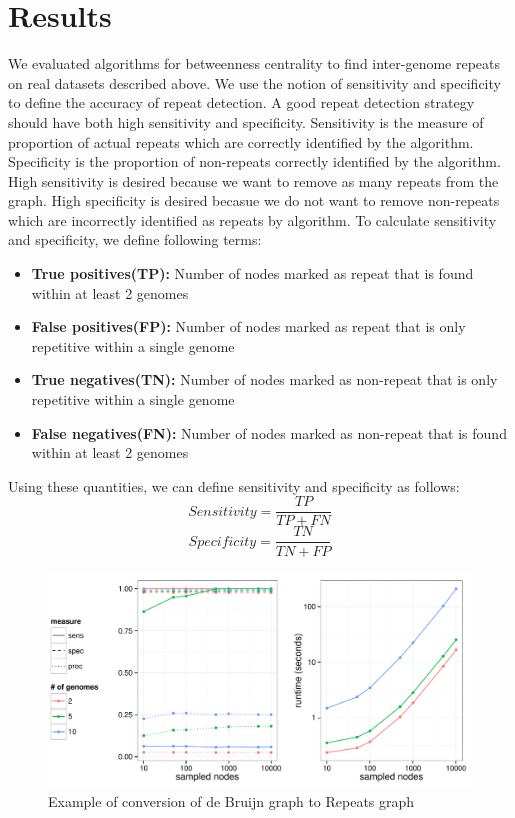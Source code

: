 \documentclass[runningheads,a4paper]{llncs}
\begin{document}
\section{Results} 
We evaluated algorithms for betweenness centrality to find inter-genome repeats on real datasets described above. We use the notion of sensitivity and specificity to define the accuracy of repeat detection. A good repeat detection strategy should have both high sensitivity and specificity. Sensitivity is the measure of proportion of actual repeats which are correctly identified by the algorithm. Specificity is the proportion of non-repeats correctly identified by the algorithm. High sensitivity is desired because we want to remove as many repeats from the graph. High specificity is desired becasue we do not want to remove non-repeats which are incorrectly identified as repeats by algorithm. To calculate sensitivity and specificity, we define following terms:
\begin{itemize}
\item \textbf{True positives(TP):} Number of nodes marked as repeat that is found within at least 2 genomes
\item \textbf{False positives(FP):} Number of nodes marked as repeat that is only repetitive within a single genome
\item \textbf{True negatives(TN):} Number of nodes marked as non-repeat that is only repetitive within a single genome
\item \textbf{False negatives(FN):} Number of nodes marked as non-repeat that is found within at least 2 genomes
\end{itemize}

Using these quantities, we can define sensitivity and specificity as follows:
 $$Sensitivity = \frac{TP}{TP+FN}$$
 $$Specificity = \frac{TN}{TN+FP}$$


\begin{figure}[htbp]
\centering
\includegraphics[width = \textwidth]{sampled_nodes}
\caption{Example of conversion of de Bruijn graph to Repeats graph}
\label{fig:sampled_nodes}
\end{figure}
\end{document}
